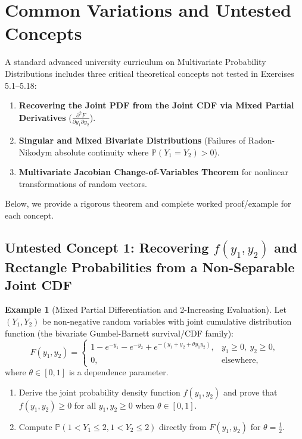 \documentclass[11pt, letterpaper]{article}
\theoremstyle{definition}
\newtheorem{example}{Example}[section]
\theoremstyle{remark}
\begin{document}
\newpage

\section{Common Variations and Untested Concepts}

A standard advanced university curriculum on Multivariate Probability Distributions includes three critical theoretical concepts not tested in Exercises 5.1--5.18:
\begin{enumerate}[label=\textbf{\arabic*.}]
    \item \textbf{Recovering the Joint PDF from the Joint CDF via Mixed Partial Derivatives} ($\frac{\partial^2 F}{\partial y_1 \partial y_2}$).
    \item \textbf{Singular and Mixed Bivariate Distributions} (Failures of Radon-Nikodym absolute continuity where $\mathbb{P}(Y_1 = Y_2) > 0$).
    \item \textbf{Multivariate Jacobian Change-of-Variables Theorem} for nonlinear transformations of random vectors.
\end{enumerate}
Below, we provide a rigorous theorem and complete worked proof/example for each concept.

\subsection{Untested Concept 1: Recovering $f(y_1, y_2)$ and Rectangle Probabilities from a Non-Separable Joint CDF}

\begin{example}[Mixed Partial Differentiation and 2-Increasing Evaluation]
Let $(Y_1, Y_2)$ be non-negative random variables with joint cumulative distribution function (the bivariate Gumbel-Barnett survival/CDF family):
\[
    F(y_1, y_2) = \begin{cases}
        1 - e^{-y_1} - e^{-y_2} + e^{-(y_1 + y_2 + \theta y_1 y_2)}, & y_1 \ge 0,\ y_2 \ge 0, \\
        0, & \text{elsewhere,}
    \end{cases}
\]
where $\theta \in [0, 1]$ is a dependence parameter.
\begin{enumerate}[label=(\alph*)]
    \item Derive the joint probability density function $f(y_1, y_2)$ and prove that $f(y_1, y_2) \ge 0$ for all $y_1, y_2 \ge 0$ when $\theta \in [0, 1]$.
    \item Compute $\mathbb{P}(1 < Y_1 \le 2, 1 < Y_2 \le 2)$ directly from $F(y_1, y_2)$ for $\theta = \frac{1}{2}$.
\end{enumerate}
\end{example}
\end{document}

